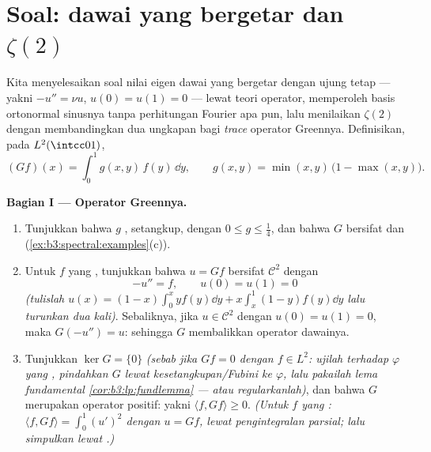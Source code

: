 \section{Soal: dawai yang bergetar dan
\texorpdfstring{$\zeta(2)$}{zeta(2)}}

\begin{problem}\label{pb:b3:spectral:1}
Kita menyelesaikan soal nilai eigen dawai yang bergetar dengan
ujung tetap --- yakni $-u'' = \nu u$, $u(0) = u(1) = 0$ --- lewat
teori operator, memperoleh basis ortonormal sinusnya tanpa
perhitungan Fourier apa pun, lalu menilaikan $\zeta(2)$ dengan membandingkan dua
ungkapan bagi \emph{trace} operator Greennya.
Definisikan, pada $L^2(\intcc01)$,
\[
(Gf)(x) = \int_0^1 g(x,y)\,f(y)\,\dd y,
\qquad
g(x, y) = \min(x,y)\,\bigl(1 - \max(x,y)\bigr).
\]

\medskip
\noindent\textbf{Bagian I --- Operator Greennya.}
\begin{enumerate}
  \item Tunjukkan bahwa $g$ , setangkup, dengan $0 \leq g
        \leq \frac14$, dan bahwa $G$ bersifat  dan
         (\cref{ex:b3:spectral:examples}(c)).
  \item Untuk $f$ yang , tunjukkan bahwa $u = Gf$ bersifat $\mathcal
        C^2$ dengan
        \[
        -u'' = f, \qquad u(0) = u(1) = 0
        \]
        \emph{(tulislah $u(x) = (1-x)\int_0^xyf(y)\dd y +
        x\int_x^1(1-y)f(y)\dd y$ lalu turunkan dua kali)}.
        Sebaliknya, jika $u \in \mathcal C^2$ dengan $u(0) = u(1)
        = 0$, maka $G(-u'') = u$: sehingga $G$ membalikkan operator
        dawainya.
  \item Tunjukkan $\ker G = \{0\}$ \emph{(sebab jika $Gf = 0$ dengan $f \in
        L^2$: ujilah terhadap $\varphi$ yang , pindahkan $G$
        lewat kesetangkupan/Fubini ke $\varphi$, lalu pakailah
        lema fundamental \cref{cor:b3:lp:fundlemma} --- atau
        regularkanlah)}, dan bahwa $G$ merupakan operator positif:
        yakni $\langle f, Gf\rangle \geq 0$. \emph{(Untuk $f$ yang
        : $\langle f, Gf\rangle = \int_0^1 (u')^2$ dengan $u
        = Gf$, lewat pengintegralan parsial; lalu simpulkan lewat .)}
\end{enumerate}


\end{problem}
